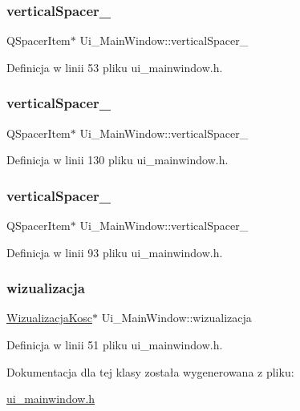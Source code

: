 \subsubsection{\texorpdfstring{vertical\+Spacer\+\_}{verticalSpacer\_4}}
{\footnotesize\ttfamily Q\+Spacer\+Item$\ast$ Ui\+\_\+\+Main\+Window\+::vertical\+Spacer\+\_}



Definicja w linii 53 pliku ui\+\_\+mainwindow.\+h.

\mbox{\label{class_ui___main_window_a9d4bfb2fa0d87ccf9f7a311116676be6}} 
\subsubsection{\texorpdfstring{vertical\+Spacer\+\_}{verticalSpacer\_5}}
{\footnotesize\ttfamily Q\+Spacer\+Item$\ast$ Ui\+\_\+\+Main\+Window\+::vertical\+Spacer\+\_}



Definicja w linii 130 pliku ui\+\_\+mainwindow.\+h.

\mbox{\label{class_ui___main_window_a2e4c63737c14e5af736837df590fe004}} 
\subsubsection{\texorpdfstring{vertical\+Spacer\+\_}{verticalSpacer\_6}}
{\footnotesize\ttfamily Q\+Spacer\+Item$\ast$ Ui\+\_\+\+Main\+Window\+::vertical\+Spacer\+\_}



Definicja w linii 93 pliku ui\+\_\+mainwindow.\+h.

\mbox{\label{class_ui___main_window_ad718dc71d168fd759d27806468beb381}} 
\subsubsection{\texorpdfstring{wizualizacja}{wizualizacja}}
{\footnotesize\ttfamily \hyperlink{class_wizualizacja_kosc}{Wizualizacja\+Kosc}$\ast$ Ui\+\_\+\+Main\+Window\+::wizualizacja}



Definicja w linii 51 pliku ui\+\_\+mainwindow.\+h.



Dokumentacja dla tej klasy została wygenerowana z pliku\+:\begin{DoxyCompactItemize}
\item 
\hyperlink{ui__mainwindow_8h}{ui\+\_\+mainwindow.\+h}\end{DoxyCompactItemize}
